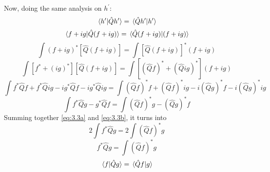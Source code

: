 \documentclass[12pt]{article}
\begin{document}
Now, doing the same analysis on $h^\prime$:
\[\braket*{h^\prime}{\hat{Q}h^\prime} = \braket*{\hat{Q}h^\prime}{h^\prime}\]
\[\braket*{f+ig}{\hat{Q}(f+ig)} = \braket*{\hat{Q}(f+ig)}{(f+ig)}\]
\[\int(f+ig)^*[\hat{Q}(f+ig)] = \int[\hat{Q}(f+ig)]^*(f+ig)\]
\[\int[f^*+(ig)^*][\hat{Q}(f+ig)] = \int[(\hat{Q}f)^* + (\hat{Q}ig)^*](f+ig)\]
\[\int f^*\hat{Q}f + f^*\hat{Q}ig - ig^*\hat{Q}f - ig^*\hat{Q}ig = \int (\hat{Q}f)^*f+(\hat{Q}f)^*ig - i(\hat{Q}g)^*f - i(\hat{Q}g)^*ig\]
\begin{equation}
\int f^* \hat{Q}g - g^*\hat{Q}f = \int (\hat{Q}f)^*g - (\hat{Q}g)^*f
\label{eq:3.3b}
\end{equation}
Summing together \ref{eq:3.3a} and \ref{eq:3.3b}, it turns into
\[2\int f^*\hat{Q}g = 2\int (\hat{Q}f)^*g\]
\[f^* \hat{Q} g = \int (\hat{Q}f)^* g\]
\[\braket*{f}{\hat{Q}g} = \braket*{\hat{Q}f}{g}\]
\end{document}

